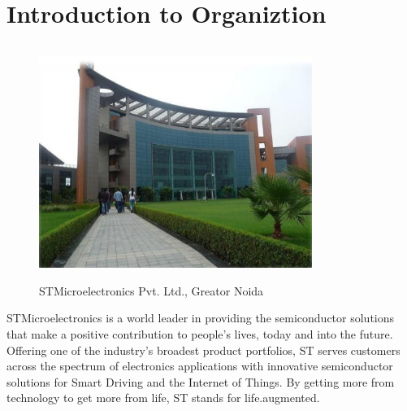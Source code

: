 \chapter{Introduction to Organiztion}
\begin{figure}[ht]
	\centering
	\includegraphics[width=3.5in, height=3in]{images/company.jpg}
	\caption{STMicroelectronics Pvt. Ltd., Greator Noida}
\end{figure}
\noindent STMicroelectronics is a world leader in providing the semiconductor solutions that make a positive contribution to people's lives, today and into the future.\\
\noindent Offering one of the industry's broadest product portfolios, ST serves customers across the spectrum of electronics applications with innovative semiconductor solutions for Smart Driving and the Internet of Things. By getting more from technology to get more from life, ST stands for life.augmented.
